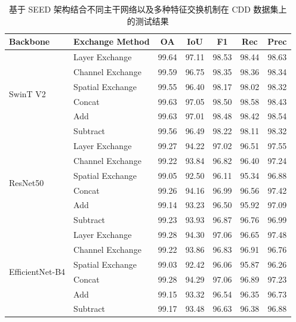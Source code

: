 \begin{table}[!htbp]
\centering
\caption{基于 SEED 架构结合不同主干网络以及多种特征交换机制在 CDD 数据集上的测试结果}
\label{tab:seed_cdd_backbone}
\begin{tabular}{l l c c c c c}
\hline
\textbf{Backbone} & \textbf{Exchange Method} & \textbf{OA} & \textbf{IoU} & \textbf{F1} & \textbf{Rec} & \textbf{Prec} \\
\hline
\multirow{6}{*}{SwinT V2} 
 & Layer Exchange    & 99.64 & 97.11 & 98.53 & 98.44 & 98.63 \\
 & Channel Exchange  & 99.59 & 96.75 & 98.35 & 98.36 & 98.34 \\
 & Spatial Exchange  & 99.55 & 96.40 & 98.17 & 98.02 & 98.32 \\
\cline{2-7}
 & Concat            & 99.63 & 97.05 & 98.50 & 98.58 & 98.43 \\
 & Add               & 99.63 & 97.01 & 98.48 & 98.42 & 98.54 \\
 & Subtract             & 99.56	& 96.49	& 98.22	& 98.11	& 98.32 \\

\hline
\multirow{6}{*}{ResNet50} 
 & Layer Exchange    & 99.27 & 94.22 & 97.02 & 96.51 & 97.55 \\
 & Channel Exchange  & 99.22 & 93.84 & 96.82 & 96.40 & 97.24 \\
 & Spatial Exchange  & 99.05 & 92.50 & 96.11 & 95.34 & 96.88 \\
\cline{2-7}
 & Concat            & 99.26	& 94.16	& 96.99	& 96.56	& 97.42 \\
 & Add               & 99.14 & 93.23 & 96.50 & 95.92 & 97.09 \\
 & Subtract             & 99.23 & 93.93 & 96.87 & 96.76 & 96.99 \\
\hline
\multirow{6}{*}{EfficientNet-B4} 
 & Layer Exchange    & 99.28 & 94.30 & 97.06 & 96.65 & 97.48 \\
 & Channel Exchange  & 99.22 & 93.86 & 96.83 & 96.91 & 96.76 \\
 & Spatial Exchange  & 99.03 & 92.42 & 96.06 & 95.87 & 96.26 \\
\cline{2-7}
 & Concat            & 99.28	& 94.29	& 97.06	& 96.89	& 97.23 \\
 & Add               & 99.15	& 93.32	& 96.54	& 96.35	& 96.73 \\
 & Subtract             & 99.17	& 93.48	& 96.63	& 96.38	& 96.88 \\

\hline
\end{tabular}
\end{table}


